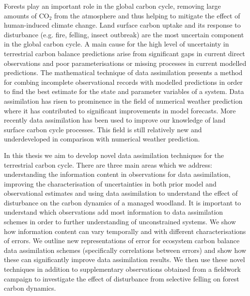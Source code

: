 Forests play an important role in the global carbon cycle, removing large amounts of CO\(_2\) from the atmosphere and thus helping to mitigate the effect of human-induced climate change. Land surface carbon uptake and its response to disturbance (e.g. fire, felling, insect outbreak) are the most uncertain component in the global carbon cycle. A main cause for the high level of uncertainty in terrestrial carbon balance predictions arise from significant gaps in current direct observations and poor parameterisations or missing processes in current modelled predictions. The mathematical technique of data assimilation presents a method for combing incomplete observational records with modelled predictions in order to find the best estimate for the state and parameter variables of a system. Data assimilation has risen to prominence in the field of numerical weather prediction where it has contributed to significant improvements in model forecasts. More recently data assimilation has been used to improve our knowledge of land surface carbon cycle processes. This field is still relatively new and underdeveloped in comparison with numerical weather prediction.

In this thesis we aim to develop novel data assimilation techniques for the terrestrial carbon cycle. There are three main areas which we address: understanding the information content in observations for data assimilation, improving the characterisation of uncertainties in both prior model and observational estimates and using data assimilation to understand the effect of disturbance on the carbon dynamics of a managed woodland. It is important to understand which observations add most information to data assimilation schemes in order to further understanding of unconstrained systems. We show how information content can vary temporally and with different characterisations of errors. We outline new representations of error for ecosystem carbon balance data assimilation schemes (specifically correlations between errors) and show how these can significantly improve data assimilation results. We then use these novel techniques in addition to supplementary observations obtained from a fieldwork campaign to investigate the effect of disturbance from selective felling on forest carbon dynamics.     

